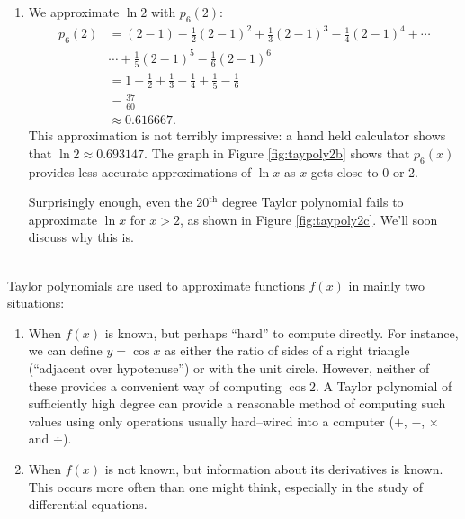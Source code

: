 {\begin{enumerate}
\begin{align*}
p_6(1.5) &= (1.5-1)-\frac12(1.5-1)^2+\frac13(1.5-1)^3-\frac14(1.5-1)^4+\cdots \\
			&\cdots +\frac15(1.5-1)^5-\frac16(1.5-1)^6\\
	&=\frac{259}{640}\\
	&\approx 0.404688.
\end{align*}
\normalsize
This is a good approximation as a calculator shows that $\ln 1.5 \approx 0.4055.$ Figure \ref{fig:taypoly2b} plots $y=\ln x$ with $y=p_6(x)$. We can see that $\ln 1.5\approx p_6(1.5)$.

\item	
We approximate $\ln 2$ with $ p_6(2)$:
\begin{align*}
p_6(2) &= (2-1)-\frac12(2-1)^2+\frac13(2-1)^3-\frac14(2-1)^4+\cdots \\
			&\cdots +\frac15(2-1)^5-\frac16(2-1)^6\\
			&=	1-\frac12+\frac13-\frac14+\frac15-\frac16 \\
			&= \frac{37}{60}\\ 
			&\approx 0.616667.
\end{align*}
This approximation is not terribly impressive: a hand held calculator shows that $\ln 2 \approx 0.693147.$ The graph in Figure \ref{fig:taypoly2b} shows that $p_6(x)$ provides less accurate approximations of $\ln x$ as $x$ gets close to 0 or 2. 

Surprisingly enough, even the 20$^\text{th}$ degree Taylor polynomial fails to approximate $\ln x$ for $x>2$, as shown in Figure \ref{fig:taypoly2c}. We'll soon discuss why this is.
\end{enumerate}
\baselineskip
}\\

Taylor polynomials are used to approximate functions $f(x)$ in mainly two situations:
	\begin{enumerate}
	\item		When $f(x)$ is known, but perhaps ``hard'' to compute directly. For instance, we can define $y=\cos x$ as either the ratio of sides of a right triangle (``adjacent over hypotenuse'') or with the unit circle. However, neither of these provides a convenient way of computing $\cos 2$. A Taylor polynomial of sufficiently high degree can provide a reasonable method of computing such values using only operations usually hard--wired into a computer ($+$, $-$, $\times$ and $\div$).
	
	\item		When $f(x)$ is not known, but information about its derivatives is known. This occurs more often than one might think, especially in the study of differential equations.
	\end{enumerate}

